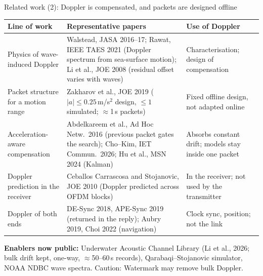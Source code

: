\documentclass[aspectratio=169,11pt]{beamer}
\begin{document}
\begin{frame}{Related work (2): Doppler is compensated, and packets are designed offline}
\scriptsize\setlength{\tabcolsep}{3pt}\renewcommand{\arraystretch}{0.9}
\begin{tabular}{@{}L{0.21\textwidth}L{0.45\textwidth}L{0.30\textwidth}@{}}
\toprule
\textbf{Line of work} & \textbf{Representative papers} & \textbf{Use of Doppler}\\
\midrule
Physics of wave-induced Doppler & Walstead, JASA 2016--17; Rawat, IEEE TAES 2021 (Doppler spectrum from sea-surface motion); Li et al., JOE 2008 (residual offset varies with waves) & Characterisation; design of compensation\\
Packet structure for a motion range & Zakharov et al., JOE 2019 ($|a|\le0.25$\,m/s$^2$ design, $\le1$ simulated; $\approx$1\,s packets) & \textcolor{amber!85!black}{Fixed offline design}, not adapted online\\
Acceleration-aware compensation & Abdelkareem et al., Ad Hoc Netw.\ 2016 (previous packet gates the search); Cho--Kim, IET Commun.\ 2026; Hu et al., MSN 2024 (Kalman) & Absorbs constant drift; models stay inside one packet\\
Doppler prediction in the receiver & Ceballos Carrascosa and Stojanovic, JOE 2010 (Doppler predicted across OFDM blocks) & In the receiver; \textcolor{amber!85!black}{not used by the transmitter}\\
Doppler of both ends & DE-Sync 2018, APE-Sync 2019 (returned in the reply); Aubry 2019, Choi 2022 (navigation) & Clock sync, position; not the link\\
\bottomrule
\end{tabular}

\vspace{0.5mm}
\scriptsize\textbf{Enablers now public:} Underwater Acoustic Channel Library (Li et al., 2026; bulk drift kept, one-way, $\approx$50--60\,s records), Qarabaqi--Stojanovic simulator, NOAA NDBC wave spectra. \alert{Caution:} Watermark may remove bulk Doppler.
\end{frame}
\end{document}
